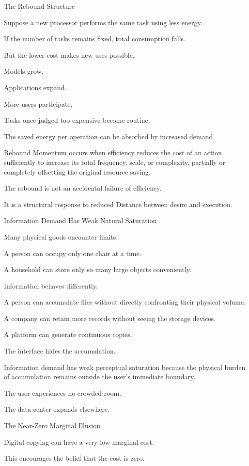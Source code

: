 The Rebound Structure

Suppose a new processor performs the same task using less energy.

If the number of tasks remains fixed, total consumption falls.

But the lower cost makes new uses possible.

Models grow.

Applications expand.

More users participate.

Tasks once judged too expensive become routine.

The saved energy per operation can be absorbed by increased demand.

Rebound Momentum occurs when efficiency reduces the cost of an action sufficiently to increase its total frequency, scale, or complexity, partially or completely offsetting the original resource saving.

The rebound is not an accidental failure of efficiency.

It is a structural response to reduced Distance between desire and execution.

Information Demand Has Weak Natural Saturation

Many physical goods encounter limits.

A person can occupy only one chair at a time.

A household can store only so many large objects conveniently.

Information behaves differently.

A person can accumulate files without directly confronting their physical volume.

A company can retain more records without seeing the storage devices.

A platform can generate continuous copies.

The interface hides the accumulation.

Information demand has weak perceptual saturation because the physical burden of accumulation remains outside the user’s immediate boundary.

The user experiences no crowded room.

The data center expands elsewhere.

The Near-Zero Marginal Illusion

Digital copying can have a very low marginal cost.

This encourages the belief that the cost is zero.


